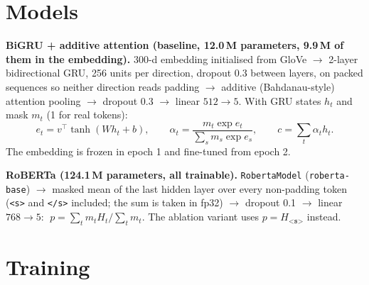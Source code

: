 \documentclass[10pt,a4paper]{article}
\newcommand{\code}[1]{\texttt{#1}}
\begin{document}
\section{Models}

\textbf{BiGRU + additive attention (baseline, 12.0\,M parameters, 9.9\,M of them in the embedding).} 300-d embedding
initialised from GloVe $\rightarrow$ 2-layer bidirectional GRU, 256 units per direction, dropout 0.3 between layers,
on packed sequences so neither direction reads padding $\rightarrow$ additive (Bahdanau-style) attention pooling
$\rightarrow$ dropout 0.3 $\rightarrow$ linear $512\to5$. With GRU states $h_t$ and mask $m_t$ (1 for real tokens):
\[
e_t = v^\top \tanh(W h_t + b), \qquad
\alpha_t = \frac{m_t \exp e_t}{\sum_s m_s \exp e_s}, \qquad
c = \sum_t \alpha_t h_t .
\]
The embedding is frozen in epoch 1 and fine-tuned from epoch 2.

\textbf{RoBERTa (124.1\,M parameters, all trainable).} \code{RobertaModel} (\code{roberta-base}) $\rightarrow$
masked mean of the last hidden layer over every non-padding token (\code{<s>} and \code{</s>} included; the sum is
taken in fp32) $\rightarrow$ dropout 0.1 $\rightarrow$ linear $768\to5$:
$\;p = \sum_t m_t H_t \big/ \sum_t m_t$. The ablation variant uses $p = H_{\code{<s>}}$ instead.

\section{Training}
\end{document}
